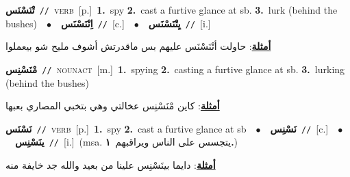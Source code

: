 \documentclass[10pt,a4paper,twoside]{article} %
\begin{document}
\begin{multicols}{2}
{\setlength\topsep{0pt}\textbf{\foreignlanguage{arabic}{تْنَسْنَس}}\ {\color{gray}\texttt{//}\color{black}}\ \textsc{verb}\ [p.]\ \textbf{1.}~spy  \textbf{2.}~cast a furtive glance at sb.  \textbf{3.}~lurk (behind the bushes)\ \ $\bullet$\ \ \setlength\topsep{0pt}\textbf{\foreignlanguage{arabic}{اِتْنَسْنَس}}\ {\color{gray}\texttt{//}\color{black}}\ [c.]\ \ $\bullet$\ \ \setlength\topsep{0pt}\textbf{\foreignlanguage{arabic}{يِتْنَسْنَس}}\ {\color{gray}\texttt{//}\color{black}}\ [i.]\  \begin{flushright}\color{gray}\foreignlanguage{arabic}{\textbf{\underline{\foreignlanguage{arabic}{أمثلة}}}: حاولت أتْنَسْنَس عليهم بس ماقدرتش أشوف مليح شو بيعملوا}\end{flushright}\color{black}} \vspace{2mm}

{\setlength\topsep{0pt}\textbf{\foreignlanguage{arabic}{مْنَسْنِس}}\ {\color{gray}\texttt{//}\color{black}}\ \textsc{noun\textunderscore act}\ [m.]\ \textbf{1.}~spying  \textbf{2.}~casting a furtive glance at sb.  \textbf{3.}~lurking (behind the bushes)\  \begin{flushright}\color{gray}\foreignlanguage{arabic}{\textbf{\underline{\foreignlanguage{arabic}{أمثلة}}}: كاين مْنَسْنِس عخالتي وهي بتخبي المصاري بعبها}\end{flushright}\color{black}} \vspace{2mm}

{\setlength\topsep{0pt}\textbf{\foreignlanguage{arabic}{نَسْنَس}}\ {\color{gray}\texttt{//}\color{black}}\ \textsc{verb}\ [p.]\ \textbf{1.}~spy  \textbf{2.}~cast a furtive glance at sb\ \ $\bullet$\ \ \setlength\topsep{0pt}\textbf{\foreignlanguage{arabic}{نَسْنِس}}\ {\color{gray}\texttt{//}\color{black}}\ [c.]\ \ $\bullet$\ \ \setlength\topsep{0pt}\textbf{\foreignlanguage{arabic}{ينَسْنِس}}\ {\color{gray}\texttt{//}\color{black}}\ [i.]\ \color{gray}(msa. \foreignlanguage{arabic}{يتجسس على الناس ويراقبهم}~\foreignlanguage{arabic}{\textbf{١.}})\color{black}\  \begin{flushright}\color{gray}\foreignlanguage{arabic}{\textbf{\underline{\foreignlanguage{arabic}{أمثلة}}}: دايما بينَسْنِس علينا من بعيد والله جد خايفة منه}\end{flushright}\color{black}} \vspace{2mm}


\end{multicols}
\end{document}
